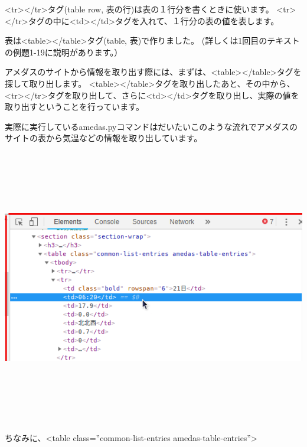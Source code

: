 \documentclass[a4paper,12pt,dvipdfmx]{jarticle}
\begin{document}
{\textless}tr{\textgreater}{\textless}/tr{\textgreater}タグ(table row,
表の行)は表の１行分を書くときに使います。
{\textless}tr{\textgreater}{\textless}/tr{\textgreater}タグの中に{\textless}td{\textgreater}{\textless}/td{\textgreater}タグを入れて、１行分の表の値を表します。


表は{\textless}table{\textgreater}{\textless}/table{\textgreater}タグ(table,
表)で作りました。
(詳しくは1回目のテキストの例題1-19に説明があります。）


アメダスのサイトから情報を取り出す際には、まずは、{\textless}table{\textgreater}{\textless}/table{\textgreater}タグを探して取り出します。
{\textless}table{\textgreater}{\textless}/table{\textgreater}タグを取り出したあと、その中から、{\textless}tr{\textgreater}{\textless}/tr{\textgreater}タグを取り出して、さらに{\textless}td{\textgreater}{\textless}/td{\textgreater}タグを取り出し、実際の値を取り出すということを行っています。


実際に実行しているamedas.pyコマンドはだいたいこのような流れでアメダスのサイトの表から気温などの情報を取り出しています。


\bigskip


\bigskip



\begin{center}
\includegraphics[width=16.178cm,height=12.051cm]{textbook-img035-3.png}

\end{center}
ちなみに、{\textless}table class=”common-list-entries amedas-table-entries”{\textgreater}
\end{document}
